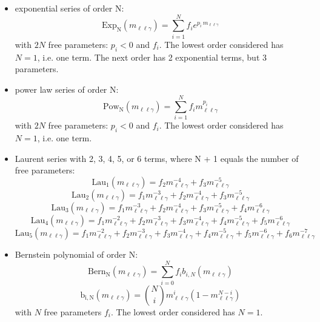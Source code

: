 \begin{itemize}
	\item exponential series of order N:
	\begin{equation}
        \mathrm{Exp_{N}}(m_{\ell\ell\gamma}) = \sum\limits_{i=1}^{N}f_ie^{p_i\, m_{\ell\ell\gamma}}
	\end{equation}
	with $2N$ free parameters: $p_i < 0$ and $f_i$.
	The lowest order considered has $N=1$, i.e. one term.
	The next order has 2 exponential terms, but 3 parameters.	

	\item power law series of order N:
	\begin{equation}
        \mathrm{Pow_{N}}(m_{\ell\ell\gamma}) = \sum\limits_{i=1}^{N}f_im_{\ell\ell\gamma}^{p_i}
	\end{equation}
	with $2N$ free parameters: $p_i < 0$ and $f_i$.
	The lowest order considered has $N=1$, i.e. one term.
	
	\item Laurent series with 2, 3, 4, 5, or 6 terms, where N + 1 equals the number of free parameters:
	\begin{equation}
        \mathrm{Lau_{1}}(m_{\ell\ell\gamma}) = f_2m_{\ell\ell\gamma}^{-4}+f_3m_{\ell\ell\gamma}^{-5}
	\end{equation}
	\begin{equation}
        \mathrm{Lau_{2}}(m_{\ell\ell\gamma}) = f_1m_{\ell\ell\gamma}^{-3}+f_2m_{\ell\ell\gamma}^{-4}+f_3m_{\ell\ell\gamma}^{-5}
	\end{equation}
	\begin{equation}
        \mathrm{Lau_{3}}(m_{\ell\ell\gamma}) = f_1m_{\ell\ell\gamma}^{-3}+f_2m_{\ell\ell\gamma}^{-4}+f_3m_{\ell\ell\gamma}^{-5}+f_4m_{\ell\ell\gamma}^{-6}
	\end{equation}
	\begin{equation}
        \mathrm{Lau_{4}}(m_{\ell\ell\gamma}) = f_1m_{\ell\ell\gamma}^{-2}+f_2m_{\ell\ell\gamma}^{-3}+f_3m_{\ell\ell\gamma}^{-4}+f_4m_{\ell\ell\gamma}^{-5}+f_5m_{\ell\ell\gamma}^{-6}
	\end{equation}
	\begin{equation}
        \mathrm{Lau_{5}}(m_{\ell\ell\gamma}) = f_1m_{\ell\ell\gamma}^{-2}+f_2m_{\ell\ell\gamma}^{-3}+f_3m_{\ell\ell\gamma}^{-4}+f_4m_{\ell\ell\gamma}^{-5}+f_5m_{\ell\ell\gamma}^{-6}+f_6m_{\ell\ell\gamma}^{-7}
	\end{equation}
	
	\item Bernstein polynomial of order N:
    \begin{equation}
        \mathrm{Bern_{N}}(m_{\ell\ell\gamma}) = \sum\limits_{i=0}^{N}f_{i}b_{i,N}(m_{\ell\ell\gamma})
    \end{equation}
    \begin{equation}
        \mathrm{b_{i,N}}(m_{\ell\ell\gamma}) = \binom{N}{i}m_{\ell\ell\gamma}^{i}(1 - m_{\ell\ell\gamma}^{N-i})
    \end{equation}
    with $N$ free parameters $f_{i}$. The lowest order considered has $N=1$.
\end{itemize}

